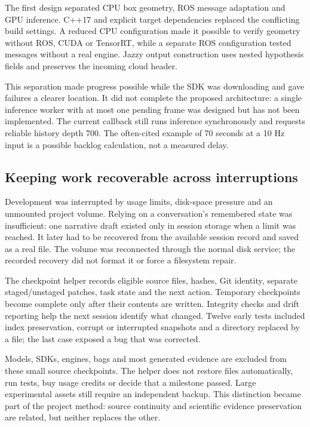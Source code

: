 \documentclass[11pt,a4paper]{article}
\begin{document}
The first design separated CPU box geometry, ROS message adaptation and GPU inference. C++17 and explicit target dependencies replaced the conflicting build settings. A reduced CPU configuration made it possible to verify geometry without ROS, CUDA or TensorRT, while a separate ROS configuration tested messages without a real engine. Jazzy output construction uses nested hypothesis fields and preserves the incoming cloud header.

This separation made progress possible while the SDK was downloading and gave failures a clearer location. It did not complete the proposed architecture: a single inference worker with at most one pending frame was designed but has not been implemented. The current callback still runs inference synchronously and requests reliable history depth 700. The often-cited example of 70 seconds at a 10 Hz input is a possible backlog calculation, not a measured delay.

\subsection{Keeping work recoverable across interruptions}

Development was interrupted by usage limits, disk-space pressure and an unmounted project volume. Relying on a conversation's remembered state was insufficient: one narrative draft existed only in session storage when a limit was reached. It later had to be recovered from the available session record and saved as a real file. The volume was reconnected through the normal disk service; the recorded recovery did not format it or force a filesystem repair.

The checkpoint helper records eligible source files, hashes, Git identity, separate staged/unstaged patches, task state and the next action. Temporary checkpoints become complete only after their contents are written. Integrity checks and drift reporting help the next session identify what changed. Twelve early tests included index preservation, corrupt or interrupted snapshots and a directory replaced by a file; the last case exposed a bug that was corrected.

Models, SDKs, engines, bags and most generated evidence are excluded from these small source checkpoints. The helper does not restore files automatically, run tests, buy usage credits or decide that a milestone passed. Large experimental assets still require an independent backup. This distinction became part of the project method: source continuity and scientific evidence preservation are related, but neither replaces the other.
\end{document}

